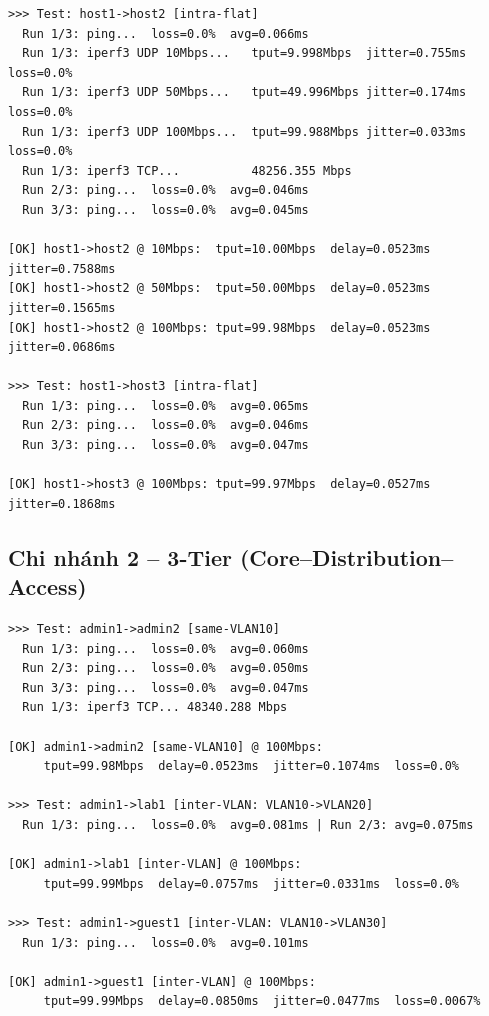 \begin{lstlisting}[style=termstyle, caption={Log đo lường intra-branch -- Flat Network}]
>>> Test: host1->host2 [intra-flat]
  Run 1/3: ping...  loss=0.0%  avg=0.066ms
  Run 1/3: iperf3 UDP 10Mbps...   tput=9.998Mbps  jitter=0.755ms  loss=0.0%
  Run 1/3: iperf3 UDP 50Mbps...   tput=49.996Mbps jitter=0.174ms  loss=0.0%
  Run 1/3: iperf3 UDP 100Mbps...  tput=99.988Mbps jitter=0.033ms  loss=0.0%
  Run 1/3: iperf3 TCP...          48256.355 Mbps
  Run 2/3: ping...  loss=0.0%  avg=0.046ms
  Run 3/3: ping...  loss=0.0%  avg=0.045ms

[OK] host1->host2 @ 10Mbps:  tput=10.00Mbps  delay=0.0523ms  jitter=0.7588ms
[OK] host1->host2 @ 50Mbps:  tput=50.00Mbps  delay=0.0523ms  jitter=0.1565ms
[OK] host1->host2 @ 100Mbps: tput=99.98Mbps  delay=0.0523ms  jitter=0.0686ms

>>> Test: host1->host3 [intra-flat]
  Run 1/3: ping...  loss=0.0%  avg=0.065ms
  Run 2/3: ping...  loss=0.0%  avg=0.046ms
  Run 3/3: ping...  loss=0.0%  avg=0.047ms

[OK] host1->host3 @ 100Mbps: tput=99.97Mbps  delay=0.0527ms  jitter=0.1868ms
\end{lstlisting}

\subsection{Chi nhánh 2 -- 3-Tier (Core--Distribution--Access)}

\begin{lstlisting}[style=termstyle, caption={Log đo lường intra-branch -- 3-Tier Network}]
>>> Test: admin1->admin2 [same-VLAN10]
  Run 1/3: ping...  loss=0.0%  avg=0.060ms
  Run 2/3: ping...  loss=0.0%  avg=0.050ms
  Run 3/3: ping...  loss=0.0%  avg=0.047ms
  Run 1/3: iperf3 TCP... 48340.288 Mbps

[OK] admin1->admin2 [same-VLAN10] @ 100Mbps:
     tput=99.98Mbps  delay=0.0523ms  jitter=0.1074ms  loss=0.0%

>>> Test: admin1->lab1 [inter-VLAN: VLAN10->VLAN20]
  Run 1/3: ping...  loss=0.0%  avg=0.081ms | Run 2/3: avg=0.075ms

[OK] admin1->lab1 [inter-VLAN] @ 100Mbps:
     tput=99.99Mbps  delay=0.0757ms  jitter=0.0331ms  loss=0.0%

>>> Test: admin1->guest1 [inter-VLAN: VLAN10->VLAN30]
  Run 1/3: ping...  loss=0.0%  avg=0.101ms

[OK] admin1->guest1 [inter-VLAN] @ 100Mbps:
     tput=99.99Mbps  delay=0.0850ms  jitter=0.0477ms  loss=0.0067%
\end{lstlisting}

